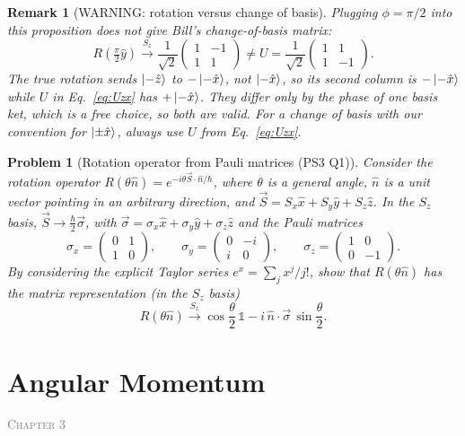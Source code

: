 \documentclass{article}
\newtheorem{problem}{Problem}
\newtheorem{remark}{Remark}
\newcommand{\id}{\mathds{1}}
\newcommand{\chapterstart}[1]{\noindent\hfill{\small\scshape\textcolor{gray}{Chapter #1}}\par}
\begin{document}
\begin{remark}[WARNING: rotation versus change of basis]
    Plugging $\phi = \pi/2$ into this proposition does \emph{not} give Bill's change-of-basis matrix:
    \[R\left(\tfrac{\pi}{2}\hat{y}\right) \xrightarrow{S_z} \frac{1}{\sqrt{2}}\begin{pmatrix} 1 & -1 \\ 1 & 1 \end{pmatrix} \neq U = \frac{1}{\sqrt{2}}\begin{pmatrix} 1 & 1 \\ 1 & -1 \end{pmatrix}.\]
    The true rotation sends $\ket{-\hat{z}}$ to $-\ket{-\hat{x}}$, not $\ket{-\hat{x}}$, so its second column is $-\ket{-\hat{x}}$ while $U$ in Eq.~\eqref{eq:Uzx} has $+\ket{-\hat{x}}$. They differ only by the phase of one basis ket, which is a free choice, so both are valid. For a change of basis with our convention for $\ket{\pm\hat{x}}$, always use $U$ from Eq.~\eqref{eq:Uzx}.
\end{remark}
\begin{problem}[Rotation operator from Pauli matrices (PS3 Q1)]
    \label{prob:R-pauli}
    Consider the rotation operator $R(\theta\hat{n}) = e^{-i\theta\vec{S}\cdot\hat{n}/\hbar}$, where $\theta$ is a general angle, $\hat{n}$ is a unit vector pointing in an arbitrary direction, and $\vec{S} = S_x\hat{x} + S_y\hat{y} + S_z\hat{z}$. In the $S_z$ basis, $\vec{S} \to \frac{\hbar}{2}\vec{\sigma}$, with $\vec{\sigma} = \sigma_x\hat{x} + \sigma_y\hat{y} + \sigma_z\hat{z}$ and the Pauli matrices
    \[\sigma_x = \begin{pmatrix} 0 & 1 \\ 1 & 0 \end{pmatrix}, \qquad \sigma_y = \begin{pmatrix} 0 & -i \\ i & 0 \end{pmatrix}, \qquad \sigma_z = \begin{pmatrix} 1 & 0 \\ 0 & -1 \end{pmatrix}.\]
    By considering the explicit Taylor series $e^x = \sum_j x^j/j!$, show that $R(\theta\hat{n})$ has the matrix representation (in the $S_z$ basis)
    \[R(\theta\hat{n}) \xrightarrow{S_z} \cos\frac{\theta}{2}\,\id - i\,\hat{n}\cdot\vec{\sigma}\,\sin\frac{\theta}{2}.\]
\end{problem}


\section{Angular Momentum}
\label{sec:angmom}
\chapterstart{3}
\end{document}
